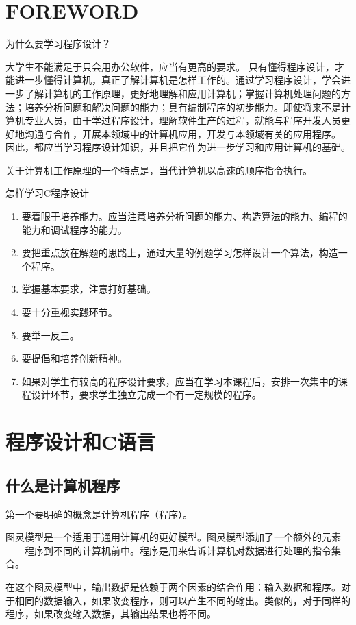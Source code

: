 \chapter{FOREWORD}
为什么要学习程序设计？

大学生不能满足于只会用办公软件，应当有更高的要求。
只有懂得程序设计，才能进一步懂得计算机，真正了解计算机是怎样工作的。通过学习程序设计，学会进一步了解计算机的工作原理，更好地理解和应用计算机；掌握计算机处理问题的方法；培养分析问题和解决问题的能力；具有编制程序的初步能力。即使将来不是计算机专业人员，由于学过程序设计，理解软件生产的过程，就能与程序开发人员更好地沟通与合作，开展本领域中的计算机应用，开发与本领域有关的应用程序。
因此，都应当学习程序设计知识，并且把它作为进一步学习和应用计算机的基础。

关于计算机工作原理的一个特点是，当代计算机以高速的顺序指令执行。

怎样学习C程序设计
\begin{enumerate}
	\item 要着眼于培养能力。应当注意培养分析问题的能力、构造算法的能力、编程的能力和调试程序的能力。
	\item 要把重点放在解题的思路上，通过大量的例题学习怎样设计一个算法，构造一个程序。
	\item 掌握基本要求，注意打好基础。
	\item 要十分重视实践环节。
	\item 要举一反三。
	\item 要提倡和培养创新精神。
	\item 如果对学生有较高的程序设计要求，应当在学习本课程后，安排一次集中的课程设计环节，要求学生独立完成一个有一定规模的程序。
\end{enumerate}

\chapter{程序设计和C语言}

\section{什么是计算机程序}

第一个要明确的概念是计算机程序（程序）。

图灵模型是一个适用于通用计算机的更好模型。图灵模型添加了一个额外的元素——程序到不同的计算机前中。程序是用来告诉计算机对数据进行处理的指令集合。

在这个图灵模型中，输出数据是依赖于两个因素的结合作用：输入数据和程序。对于相同的数据输入，如果改变程序，则可以产生不同的输出。类似的，对于同样的程序，如果改变输入数据，其输出结果也将不同。

